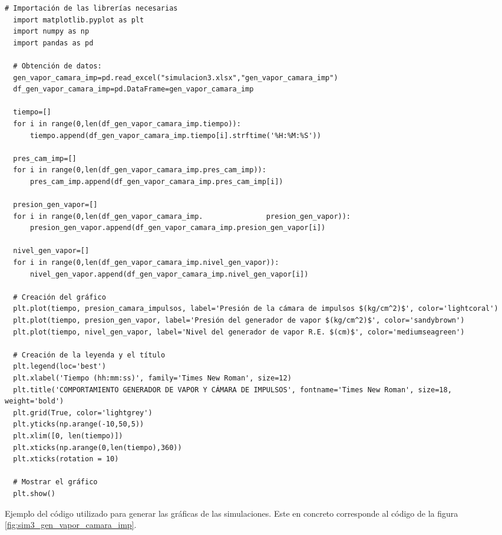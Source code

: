 \vspace{-5pt}

\begin{code}[H]
\begin{lstlisting}[firstnumber=1, breakindent=55pt]
  # Importación de las librerías necesarias
  import matplotlib.pyplot as plt
  import numpy as np
  import pandas as pd

  # Obtención de datos:
  gen_vapor_camara_imp=pd.read_excel("simulacion3.xlsx","gen_vapor_camara_imp")
  df_gen_vapor_camara_imp=pd.DataFrame=gen_vapor_camara_imp

  tiempo=[]
  for i in range(0,len(df_gen_vapor_camara_imp.tiempo)):
      tiempo.append(df_gen_vapor_camara_imp.tiempo[i].strftime('%H:%M:%S'))
    
  pres_cam_imp=[]
  for i in range(0,len(df_gen_vapor_camara_imp.pres_cam_imp)):
      pres_cam_imp.append(df_gen_vapor_camara_imp.pres_cam_imp[i])

  presion_gen_vapor=[]
  for i in range(0,len(df_gen_vapor_camara_imp.               presion_gen_vapor)):
      presion_gen_vapor.append(df_gen_vapor_camara_imp.presion_gen_vapor[i])

  nivel_gen_vapor=[]
  for i in range(0,len(df_gen_vapor_camara_imp.nivel_gen_vapor)):
      nivel_gen_vapor.append(df_gen_vapor_camara_imp.nivel_gen_vapor[i])

  # Creación del gráfico
  plt.plot(tiempo, presion_camara_impulsos, label='Presión de la cámara de impulsos $(kg/cm^2)$', color='lightcoral')
  plt.plot(tiempo, presion_gen_vapor, label='Presión del generador de vapor $(kg/cm^2)$', color='sandybrown')
  plt.plot(tiempo, nivel_gen_vapor, label='Nivel del generador de vapor R.E. $(cm)$', color='mediumseagreen')

  # Creación de la leyenda y el título
  plt.legend(loc='best')
  plt.xlabel('Tiempo (hh:mm:ss)', family='Times New Roman', size=12)
  plt.title('COMPORTAMIENTO GENERADOR DE VAPOR Y CÁMARA DE IMPULSOS', fontname='Times New Roman', size=18, weight='bold')
  plt.grid(True, color='lightgrey')
  plt.yticks(np.arange(-10,50,5))
  plt.xlim([0, len(tiempo)])
  plt.xticks(np.arange(0,len(tiempo),360))
  plt.xticks(rotation = 10)

  # Mostrar el gráfico
  plt.show()
\end{lstlisting}
\vspace{-5pt}
\caption{Ejemplo del código utilizado para generar las gráficas de las simulaciones. Este en concreto corresponde al código de la figura \ref{fig:sim3_gen_vapor_camara_imp}.}
\label{cod:codigo_graficas}
\end{code}